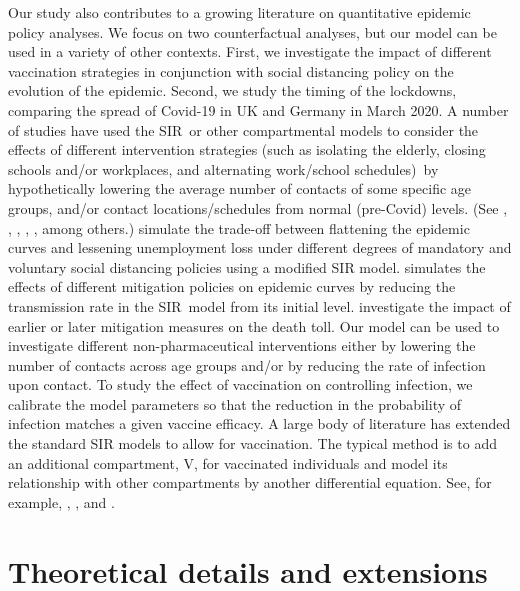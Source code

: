 \documentclass[12pt]{article}
\begin{document}
Our study also contributes to a growing literature on quantitative epidemic
policy analyses. We focus on two counterfactual analyses, but our model can be
used in a variety of other contexts. First, we investigate the impact of
different vaccination strategies in conjunction with social distancing policy
on the evolution of the epidemic. Second, we study the timing of the
lockdowns, comparing the spread of Covid-19 in UK and Germany in March 2020. A
number of studies have used the SIR\ or other compartmental models to consider
the effects of different intervention strategies (such as isolating the
elderly, closing schools and/or workplaces, and alternating work/school
schedules)\ by hypothetically lowering the average number of contacts of some
specific age groups, and/or contact locations/schedules from normal
(pre-Covid) levels. (See \cite{Acemoglu2020optimal},
\cite{Akbarpour2020socioeconomic}, \cite{Ferguson2020report},
\cite{Matrajt2020Washington}, \cite{Willem2020socrates}, among others.)
\citet*{CPR2020distancing}
simulate the trade-off between flattening the epidemic curves and lessening
unemployment loss under different degrees of mandatory and voluntary social
distancing policies using a modified SIR model. \cite{Toda2020SIR} simulates
the effects of different mitigation policies on epidemic curves by reducing
the transmission rate in the SIR\ model from its initial level.
\cite{Atkeson2020estimating} investigate the impact of earlier or later
mitigation measures on the death toll. Our model can be used to investigate
different non-pharmaceutical interventions either by lowering the number of
contacts across age groups and/or by reducing the rate of infection upon
contact. To study the effect of vaccination on controlling infection, we
calibrate the model parameters so that the reduction in the probability of
infection matches a given vaccine efficacy. A large body of literature has
extended the standard SIR models to allow for vaccination. The typical method
is to add an additional compartment, V, for vaccinated individuals and model
its relationship with other compartments by another differential equation.
See, for example,
\citet*{Berkane2021vacc}%
, \cite{Dashtbali2021vacc}, and \cite{Schlickeiser2021vacc}.

\section{Theoretical details and extensions\label{Sup: theory}}
\end{document}
